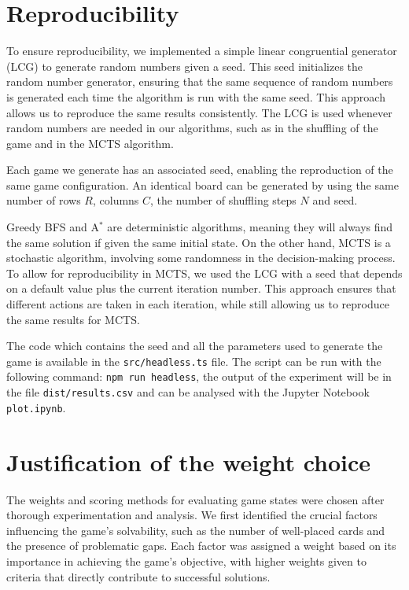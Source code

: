 \section{Reproducibility}
To ensure reproducibility, we implemented a simple linear congruential generator (LCG) to generate random numbers given a seed. This seed initializes the random number generator, ensuring that the same sequence of random numbers is generated each time the algorithm is run with the same seed. This approach allows us to reproduce the same results consistently. The LCG is used whenever random numbers are needed in our algorithms, such as in the shuffling of the game and in the MCTS algorithm.

Each game we generate has an associated seed, enabling the reproduction of the same game configuration. An identical board can be generated by using the same number of rows $R$, columns $C$, the number of shuffling steps $N$ and seed.

Greedy BFS and A$^*$ are deterministic algorithms, meaning they will always find the same solution if given the same initial state. On the other hand, MCTS is a stochastic algorithm, involving some randomness in the decision-making process. To allow for reproducibility in MCTS, we used the LCG with a seed that depends on a default value plus the current iteration number. This approach ensures that different actions are taken in each iteration, while still allowing us to reproduce the same results for MCTS.

The code which contains the seed and all the parameters used to generate the game is available in the \texttt{src/headless.ts} file. The script can be run with the following command: \texttt{npm run headless}, the output of the experiment will be in the file \texttt{dist/results.csv} and can be analysed with the Jupyter Notebook \texttt{plot.ipynb}.

\section{Justification of the weight choice}
The weights and scoring methods for evaluating game states were chosen after thorough experimentation and analysis. We first identified the crucial factors influencing the game's solvability, such as the number of well-placed cards and the presence of problematic gaps. Each factor was assigned a weight based on its importance in achieving the game's objective, with higher weights given to criteria that directly contribute to successful solutions.

